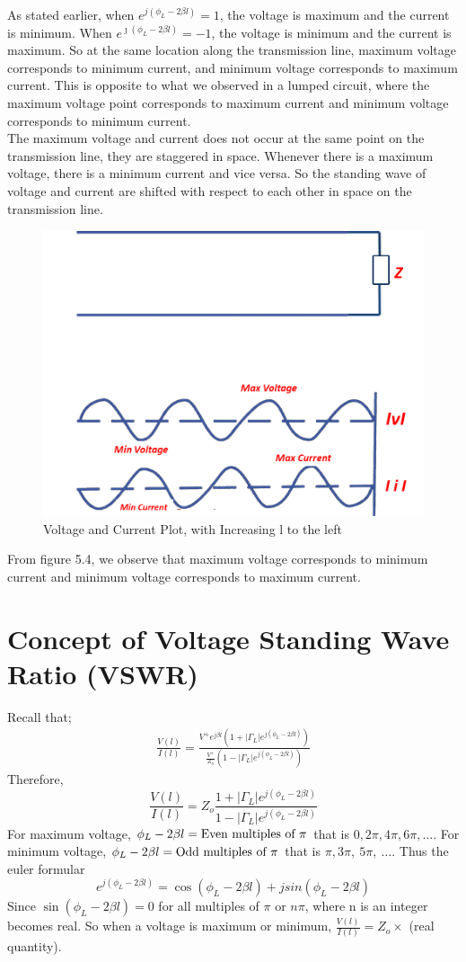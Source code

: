  As stated earlier, when $ e^{j(\phi_L - 2 \beta l)} = 1$, the voltage is maximum and the current is minimum. When $ e^{\jmath(\phi_L - 2 \beta l)} = -1$, the voltage is minimum and the current is maximum. So at the same location along the transmission line, maximum voltage corresponds to minimum current, and minimum voltage corresponds to maximum current. This is opposite to what we observed in a lumped circuit, where the maximum voltage point corresponds to maximum current and minimum voltage corresponds to minimum current.\\
The maximum voltage and current does not occur at the same point on the transmission line, they are staggered in space. Whenever there is a maximum voltage, there is a minimum current and vice versa. So the standing wave of voltage and current are shifted with respect to each other in space on the transmission line. 
\begin{figure}[h]
\centering
\includegraphics[width=0.7\linewidth]{./graphics/fig5.4modified}
\caption{Voltage and Current Plot, with Increasing l to the left}
\label{fig:asdfghjhgfdsa}
\end{figure}
From figure 5.4, we observe that maximum voltage corresponds to minimum current and minimum voltage corresponds to maximum current.

\section{Concept of Voltage Standing Wave Ratio (VSWR)}
Recall that;
\begin{align*}
\frac{V(l)}{I(l)} = \frac{V^{+}e^{j\beta l}(1+ |\Gamma_L|e^{j(\phi_L- 2 \beta l)})}{\frac{V^{+}}{Z_o}(1- |\Gamma_L|e^{j(\phi_L- 2\beta l)})}
\end{align*}
Therefore,
\begin{equation*}
\frac{V(l)}{I(l)} = Z_o \frac{1+ |\Gamma_L|e^{j(\phi_L- 2 \beta l)}}{1- |\Gamma_L|e^{j(\phi_L- 2\beta l)}}
\end{equation*}
For maximum voltage, $\phi_L-2\beta l = \textnormal{Even multiples of }\pi$ that is $0, 2\pi, 4\pi,  6\pi,\ldots$. For minimum voltage,  $\phi_L-2\beta l=\textnormal{Odd multiples of } \pi$ that is $\pi, 3\pi,\ 5\pi,\ \ldots$. Thus the euler formular 
\[e^{j(\phi_L - 2 \beta l)} = \cos(\phi_L - 2 \beta l) + jsin(\phi_L - 2 \beta l)\]
Since $\sin(\phi_L - 2 \beta l) = 0$ for all multiples of $\pi$ or $n\pi$, where n is an integer becomes real. So when a voltage is maximum or minimum, $\frac{V(l)}{I(l)} = Z_o \times$ (real quantity).

